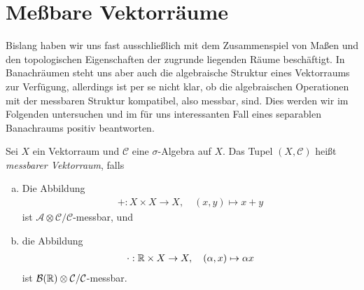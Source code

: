 \section{Meßbare Vektorräume}
Bislang haben wir uns fast ausschließlich mit dem Zusammenspiel von Maßen und den topologischen Eigenschaften der zugrunde liegenden Räume beschäftigt.
In Banachräumen steht uns aber auch die algebraische Struktur eines Vektorraums zur Verfügung, allerdings ist per se nicht klar, ob die algebraischen Operationen mit der messbaren Struktur kompatibel, also messbar, sind. 
Dies werden wir im Folgenden untersuchen und im für uns interessanten Fall eines separablen Banachraums positiv beantworten. 

\begin{mydef}
    Sei $X$ ein Vektorraum und $\mathcal{C}$ eine $\sigma$-Algebra auf $X$. Das Tupel $(X, \mathcal{C})$ heißt \textit{messbarer Vektorraum}, falls
    \begin{enumerate}[(a)]
        \item Die Abbildung 
        \begin{align*}
            + : X \times X \to X, \quad (x,y) \mapsto x + y
        \end{align*}
        ist $\mathcal{A}\otimes \mathcal{C}/\mathcal{C}$-messbar, und
        \item die Abbildung 
        \begin{align*}
            \cdot : \mathbb{R} \times X \to X, \quad  (\alpha, x) \mapsto \alpha x
        \end{align*}
        ist $\mathcal{B}(\mathbb{R}) \otimes \mathcal{C}/\mathcal{C}$-messbar. 
    \end{enumerate}
\end{mydef}


